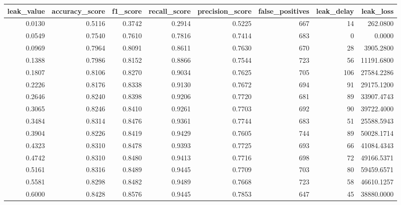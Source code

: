 \begin{tabular}{rrrrrrrr}
\toprule
leak\_value & accuracy\_score & f1\_score & recall\_score & precision\_score & false\_positives & leak\_delay & leak\_loss \\
\midrule
0.0130 & 0.5116 & 0.3742 & 0.2914 & 0.5225 & 667 & 14 & 262.0800 \\
0.0549 & 0.7540 & 0.7610 & 0.7816 & 0.7414 & 683 & 0 & 0.0000 \\
0.0969 & 0.7964 & 0.8091 & 0.8611 & 0.7630 & 670 & 28 & 3905.2800 \\
0.1388 & 0.7986 & 0.8152 & 0.8866 & 0.7544 & 723 & 56 & 11191.6800 \\
0.1807 & 0.8106 & 0.8270 & 0.9034 & 0.7625 & 705 & 106 & 27584.2286 \\
0.2226 & 0.8176 & 0.8338 & 0.9130 & 0.7672 & 694 & 91 & 29175.1200 \\
0.2646 & 0.8240 & 0.8398 & 0.9206 & 0.7720 & 681 & 89 & 33907.4743 \\
0.3065 & 0.8246 & 0.8410 & 0.9261 & 0.7703 & 692 & 90 & 39722.4000 \\
0.3484 & 0.8314 & 0.8476 & 0.9361 & 0.7744 & 683 & 51 & 25588.5943 \\
0.3904 & 0.8226 & 0.8419 & 0.9429 & 0.7605 & 744 & 89 & 50028.1714 \\
0.4323 & 0.8310 & 0.8478 & 0.9393 & 0.7725 & 693 & 66 & 41084.4343 \\
0.4742 & 0.8310 & 0.8480 & 0.9413 & 0.7716 & 698 & 72 & 49166.5371 \\
0.5161 & 0.8316 & 0.8489 & 0.9445 & 0.7709 & 703 & 80 & 59459.6571 \\
0.5581 & 0.8298 & 0.8482 & 0.9489 & 0.7668 & 723 & 58 & 46610.1257 \\
0.6000 & 0.8428 & 0.8576 & 0.9445 & 0.7853 & 647 & 45 & 38880.0000 \\
\bottomrule
\end{tabular}
